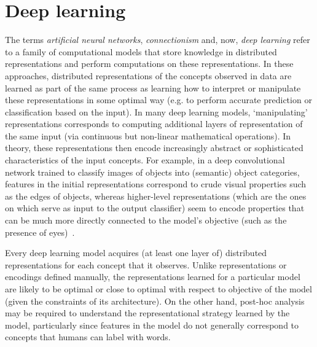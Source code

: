 \documentclass[11pt,letterpaper]{article}
\begin{document}
\section{Deep learning} The terms \emph{artificial neural networks}, \emph{connectionism} and, now, \emph{deep learning} refer to a family of computational models that store knowledge in distributed representations and perform computations on these representations. In these approaches, distributed representations of the concepts observed in data are learned as part of the same process as learning how to interpret or manipulate these representations in some optimal way (e.g. to perform accurate prediction or classification based on the input). In many deep learning models, `manipulating' representations corresponds to computing additional layers of representation of the same input (via continuous but non-linear mathematical operations). In theory, these representations then encode increasingly abstract or sophisticated characteristics of the input concepts. For example, in a deep convolutional network trained to classify images of objects into (semantic) object categories, features in the initial representations correspond to crude visual properties such as the edges of objects, whereas higher-level representations (which are the ones on which serve as input to the output classifier) seem to encode properties that can be much more directly connected to the model's objective (such as the presence of eyes)~\citep{zeiler2014visualizing}. 

Every deep learning model acquires (at least one layer of) distributed representations for each concept that it observes. Unlike representations or encodings defined manually, the representations learned for a particular model are likely to be optimal or close to optimal with respect to objective of the model (given the constraints of its architecture). On the other hand, post-hoc analysis may be required to understand the representational strategy learned by the model, particularly since features in the model do not generally correspond to concepts that humans can label with words.        
\end{document}
